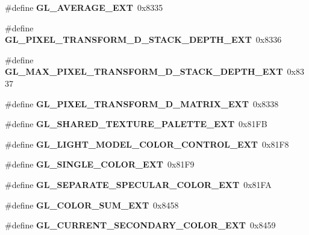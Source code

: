 \begin{DoxyCompactItemize}
\item 
\#define {\bfseries G\+L\+\_\+\+A\+V\+E\+R\+A\+G\+E\+\_\+\+E\+X\+T}~0x8335\label{_s_d_l__opengl_8h_a7d2642d294cc8acf441427b05582738f}

\item 
\#define {\bfseries G\+L\+\_\+\+P\+I\+X\+E\+L\+\_\+\+T\+R\+A\+N\+S\+F\+O\+R\+M\+\_\+D\+\_\+\+S\+T\+A\+C\+K\+\_\+\+D\+E\+P\+T\+H\+\_\+\+E\+X\+T}~0x8336\label{_s_d_l__opengl_8h_a36f0cc06c0a9ff91047ec246da6f9295}

\item 
\#define {\bfseries G\+L\+\_\+\+M\+A\+X\+\_\+\+P\+I\+X\+E\+L\+\_\+\+T\+R\+A\+N\+S\+F\+O\+R\+M\+\_\+D\+\_\+\+S\+T\+A\+C\+K\+\_\+\+D\+E\+P\+T\+H\+\_\+\+E\+X\+T}~0x8337\label{_s_d_l__opengl_8h_ae870b6a44437358a114fd339ac5ede6c}

\item 
\#define {\bfseries G\+L\+\_\+\+P\+I\+X\+E\+L\+\_\+\+T\+R\+A\+N\+S\+F\+O\+R\+M\+\_\+D\+\_\+\+M\+A\+T\+R\+I\+X\+\_\+\+E\+X\+T}~0x8338\label{_s_d_l__opengl_8h_a77ee331b93ee5ec3aeba81c08c9dffea}

\item 
\#define {\bfseries G\+L\+\_\+\+S\+H\+A\+R\+E\+D\+\_\+\+T\+E\+X\+T\+U\+R\+E\+\_\+\+P\+A\+L\+E\+T\+T\+E\+\_\+\+E\+X\+T}~0x81\+F\+B\label{_s_d_l__opengl_8h_a6346fed26c6ac240723e0f912185c1ba}

\item 
\#define {\bfseries G\+L\+\_\+\+L\+I\+G\+H\+T\+\_\+\+M\+O\+D\+E\+L\+\_\+\+C\+O\+L\+O\+R\+\_\+\+C\+O\+N\+T\+R\+O\+L\+\_\+\+E\+X\+T}~0x81\+F8\label{_s_d_l__opengl_8h_adcf51d551294f28f0355f8463bc9737f}

\item 
\#define {\bfseries G\+L\+\_\+\+S\+I\+N\+G\+L\+E\+\_\+\+C\+O\+L\+O\+R\+\_\+\+E\+X\+T}~0x81\+F9\label{_s_d_l__opengl_8h_a593e9aeddef6f33d4ecf78a61e2755e1}

\item 
\#define {\bfseries G\+L\+\_\+\+S\+E\+P\+A\+R\+A\+T\+E\+\_\+\+S\+P\+E\+C\+U\+L\+A\+R\+\_\+\+C\+O\+L\+O\+R\+\_\+\+E\+X\+T}~0x81\+F\+A\label{_s_d_l__opengl_8h_afd239a141295a983f2a440781cda4a57}

\item 
\#define {\bfseries G\+L\+\_\+\+C\+O\+L\+O\+R\+\_\+\+S\+U\+M\+\_\+\+E\+X\+T}~0x8458\label{_s_d_l__opengl_8h_ab18fd48738fff07d744dbcc6920464b4}

\item 
\#define {\bfseries G\+L\+\_\+\+C\+U\+R\+R\+E\+N\+T\+\_\+\+S\+E\+C\+O\+N\+D\+A\+R\+Y\+\_\+\+C\+O\+L\+O\+R\+\_\+\+E\+X\+T}~0x8459\label{_s_d_l__opengl_8h_a37dae0589d187e435151edb58b6ef813}


\end{DoxyCompactItemize}
